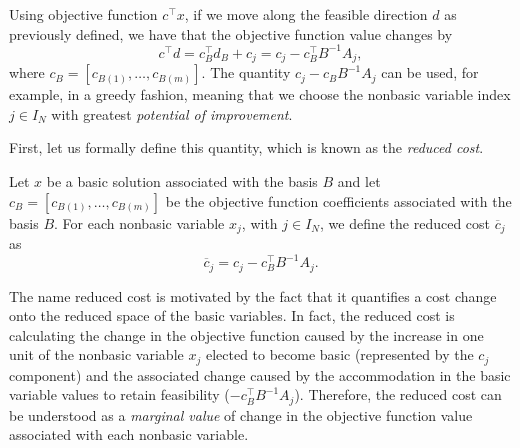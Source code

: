 Using objective function $c^\top x$, if we move along the feasible direction $d$ as previously defined, we have that the objective function value changes by 
%
\begin{equation*}
	c^\top d = c_B^\top d_B + c_j = c_j - c_B^\top B^{-1}A_j,
\end{equation*}
%
where $c_B = [c_{B(1)}, \dots, c_{B(m)}]$. The quantity $c_j - c_BB^{-1}A_j$ can be used, for example, in a greedy fashion, meaning that we choose the nonbasic variable index $j \in I_N$ with greatest \emph{potential of improvement}.

First, let us formally define this quantity, which is known as the \emph{reduced cost}. 

\begin{definition}
	Let $x$ be a basic solution associated with the basis $B$ and let $c_B = [c_{B(1)}, \dots, c_{B(m)}]$ be the objective function coefficients associated with the basis $B$. For each nonbasic variable $x_j$, with $j \in I_N$, we define the reduced cost $\overline{c}_j$ as
	\begin{equation*}
		\overline{c}_j = c_j - c_B^\top B^{-1}A_j.
	\end{equation*}
\end{definition}

The name reduced cost is motivated by the fact that it quantifies a cost change onto the reduced space of the basic variables. In fact, the reduced cost is calculating the change in the objective function caused by the increase in one unit of the nonbasic variable $x_j$ elected to become basic (represented by the $c_j$ component) and the associated change caused by the accommodation in the basic variable values to retain feasibility ($-c_B^\top B^{-1}A_j$). Therefore, the reduced cost can be understood as a \emph{marginal value} of change in the objective function value associated with each nonbasic variable.

